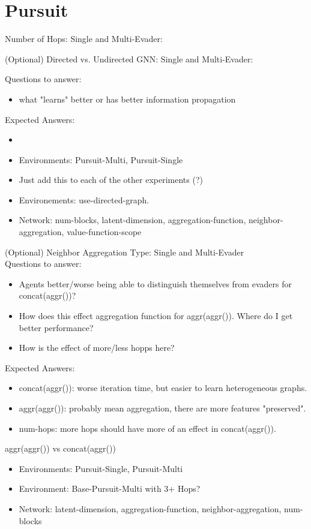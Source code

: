 \section{Pursuit}
Number of Hops: Single and Multi-Evader:
\par

(Optional) Directed vs. Undirected GNN: Single and Multi-Evader: \par
Questions to answer:
\begin{itemize}[noitemsep,nolistsep]
    \item what "learns" better or has better information propagation
\end{itemize}
Expected Answers:
\begin{itemize}[noitemsep,nolistsep]
    \item 
\end{itemize}
\begin{itemize}[noitemsep,nolistsep]
    \item Environments: Pursuit-Multi, Pursuit-Single
    \item Just add this to each of the other experiments (?)
    \item Environements: use-directed-graph.
    \item Network: num-blocks, latent-dimension, aggregation-function, neighbor-aggregation, value-function-scope
\end{itemize}
\par

(Optional) Neighbor Aggregation Type: Single and Multi-Evader \\
Questions to answer:
\begin{itemize}[noitemsep,nolistsep]
    \item Agents better/worse being able to distinguish themselves from evaders for concat(aggr())?
    \item How does this effect aggregation function for aggr(aggr()). Where do I get better performance?
    \item How is the effect of more/less hopps here?
\end{itemize}
Expected Answers:
\begin{itemize}[noitemsep,nolistsep]
    \item concat(aggr()): worse iteration time, but easier to learn heterogeneous graphs.
    \item aggr(aggr()): probably mean aggregation, there are more features "preserved".
    \item num-hops: more hops should have more of an effect in concat(aggr()).
\end{itemize}
aggr(aggr()) vs concat(aggr())
\begin{itemize}[noitemsep,nolistsep]
    \item Environments: Pursuit-Single, Pursuit-Multi
    \item Environment: Base-Pursuit-Multi with 3+ Hops?
    \item Network: latent-dimension, aggregation-function, neighbor-aggregation, num-blocks
\end{itemize}
\par

